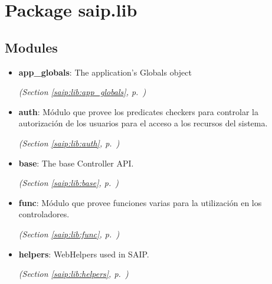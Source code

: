 %
%
%


\section{Package saip.lib}

    \label{saip:lib}


\subsection{Modules}

\begin{itemize}
\setlength{\parskip}{0ex}
\item \textbf{app\_globals}: The application's Globals object



  \textit{(Section \ref{saip:lib:app_globals}, p.~\pageref{saip:lib:app_globals})}

\item \textbf{auth}: Módulo que provee los predicates checkers para controlar la autorización de
los usuarios para el acceso a los recursos del sistema.



  \textit{(Section \ref{saip:lib:auth}, p.~\pageref{saip:lib:auth})}

\item \textbf{base}: The base Controller API.



  \textit{(Section \ref{saip:lib:base}, p.~\pageref{saip:lib:base})}

\item \textbf{func}: Módulo que provee funciones varias para la utilización en los 
controladores.



  \textit{(Section \ref{saip:lib:func}, p.~\pageref{saip:lib:func})}

\item \textbf{helpers}: WebHelpers used in SAIP.



  \textit{(Section \ref{saip:lib:helpers}, p.~\pageref{saip:lib:helpers})}

\end{itemize}


